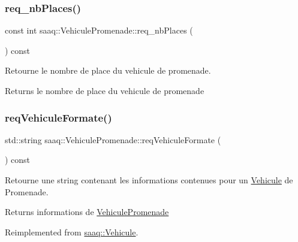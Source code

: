 \subsubsection{\texorpdfstring{req\+\_\+nb\+Places()}{req\_nbPlaces()}}
{\footnotesize\ttfamily const int saaq\+::\+Vehicule\+Promenade\+::req\+\_\+nb\+Places (\begin{DoxyParamCaption}{ }\end{DoxyParamCaption}) const}



Retourne le nombre de place du vehicule de promenade. 

\begin{DoxyReturn}{Returns}
le nombre de place du vehicule de promenade 
\end{DoxyReturn}
\mbox{\label{classsaaq_1_1VehiculePromenade_a338b22f240c47613ba08f37bf717658b}} 
\subsubsection{\texorpdfstring{req\+Vehicule\+Formate()}{reqVehiculeFormate()}}
{\footnotesize\ttfamily std\+::string saaq\+::\+Vehicule\+Promenade\+::req\+Vehicule\+Formate (\begin{DoxyParamCaption}{ }\end{DoxyParamCaption}) const\hspace{0.3cm}{\ttfamily [virtual]}}



Retourne une string contenant les informations contenues pour un \hyperlink{classsaaq_1_1Vehicule}{Vehicule} de Promenade. 

\begin{DoxyReturn}{Returns}
informations de \hyperlink{classsaaq_1_1VehiculePromenade}{Vehicule\+Promenade} 
\end{DoxyReturn}


Reimplemented from \hyperlink{classsaaq_1_1Vehicule_a9d0ff95273ecd7858cf9bd12aac359ba}{saaq\+::\+Vehicule}.

\mbox{\label{classsaaq_1_1VehiculePromenade_ad94d645be9862d1cd86953ca8a7777b9}} 
